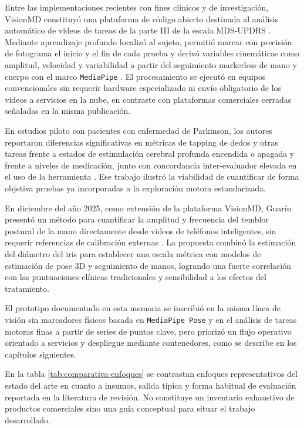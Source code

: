 Entre las implementaciones recientes con fines clínicos y de investigación, VisionMD constituyó una plataforma de código abierto destinada al análisis automático de videos de tareas de la parte III de la escala MDS-UPDRS \citep{acevedo2025visionmd}. Mediante aprendizaje profundo localizó al sujeto, permitió marcar con precisión de fotograma el inicio y el fin de cada prueba y derivó variables cinemáticas como amplitud, velocidad y variabilidad a partir del seguimiento markerless de mano y cuerpo con el marco \texttt{MediaPipe} \citep{acevedo2025visionmd,lugaresi2019mediapipe}. El procesamiento se ejecutó en equipos convencionales sin requerir hardware especializado ni envío obligatorio de los videos a servicios en la nube, en contraste con plataformas comerciales cerradas señaladas en la misma publicación.

En estudios piloto con pacientes con enfermedad de Parkinson, los autores reportaron diferencias significativas en métricas de tapping de dedos y otras tareas frente a estados de estimulación cerebral profunda encendida o apagada y frente a niveles de medicación, junto con concordancia inter-evaluador elevada en el uso de la herramienta \citep{acevedo2025visionmd}. Ese trabajo ilustró la viabilidad de cuantificar de forma objetiva pruebas ya incorporadas a la exploración motora estandarizada.

En diciembre del año 2025, como extensión de la plataforma VisionMD, Guarín presentó un método para cuantificar la amplitud y frecuencia del temblor postural de la mano directamente desde videos de teléfonos inteligentes, sin requerir referencias de calibración externas \citep{guarin2025postural}. La propuesta combinó la estimación del diámetro del iris para establecer una escala métrica con modelos de estimación de pose 3D y seguimiento de manos, logrando una fuerte correlación con las puntuaciones clínicas tradicionales y sensibilidad a los efectos del tratamiento.

El prototipo documentado en esta memoria se inscribió en la misma línea de visión sin marcadores físicos basada en \texttt{MediaPipe Pose} y en el análisis de tareas motoras finas a partir de series de puntos clave, pero priorizó un flujo operativo orientado a servicios y despliegue mediante contenedores, como se describe en los capítulos siguientes.

En la tabla \ref{tab:comparativa-enfoques} se contrastan enfoques representativos del estado del arte en cuanto a insumos, salida típica y forma habitual de evaluación reportada en la literatura de revisión. No constituye un inventario exhaustivo de productos comerciales sino una guía conceptual para situar el trabajo desarrollado.

